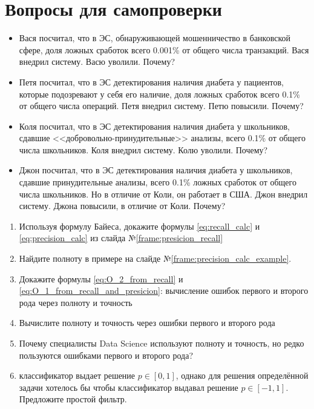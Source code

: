  \section{Вопросы для самопроверки}
  
  \begin{frame}
  \small
  \begin{itemize}
  	\item Вася посчитал, что в ЭС, обнаруживающей мошенничество в банковской сфере,
  	доля ложных сработок всего 0.001\% от общего числа транзакций. 
  	Вася внедрил систему. Васю уволили. Почему?
  	\item Петя посчитал, что в ЭС детектирования наличия диабета у пациентов,
  	которые подозревают у себя его наличие, 
  	доля ложных сработок всего 0.1\% от общего числа операций.
  	Петя внедрил систему. Петю повысили. Почему?
  	\item Коля посчитал, что в ЭС детектирования наличия диабета у 
  	школьников, сдавшие <<добровольно-принудительные>> анализы, 
  	всего 0.1\% от общего числа школьников. Коля внедрил систему. Колю уволили. Почему?
  	\item Джон посчитал, что в ЭС детектирования наличия диабета у 
  	школьников, сдавшие принудительные анализы, 
  	всего 0.1\% ложных сработок от общего числа школьников. 
  	Но в отличие от Коли, он работает в США. 
  	Джон внедрил систему. Джона повысили, в отличие от Коли. Почему?
  \end{itemize}

  \end{frame}
  
  \begin{frame}
  \begin{enumerate}
    \item Используя формулу Байеса, докажите формулы \eqref{eq:recall_calc} и \eqref{eq:precision_calc} из слайда №\ref{frame:presicion_recall}
    \item Найдите полноту в примере на слайде №\ref{frame:precision_calc_example}.
    
   
   \item Докажите формулы \eqref{eq:O_2_from_recall}
     и
     \eqref{eq:O_1_from_recall_and_presicion}:
     вычисление ошибок первого и второго рода 
     через полноту и точность
  
   \item Вычислите полноту и точность через ошибки первого и второго рода
  
   \item Почему специалисты Data Science используют полноту и точность, 
  но редко пользуются ошибками первого и второго рода?
  
      \item классификатор выдает решение $p \in [0, 1]$, однако для решения
      определённой задачи хотелось бы чтобы классификатор выдавал решение $p \in [-1, 1]$.
      Предложите простой фильтр.
  \end{enumerate}
  
  
\end{frame}

  

